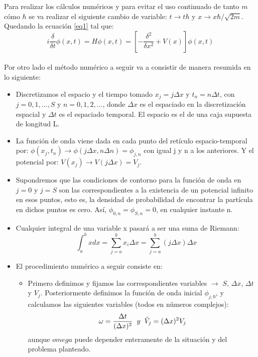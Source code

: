 \documentclass[12pt,paper]{article}
\begin{document}
Para realizar los cálculos numéricos y para evitar el uso continuado de tanto $m$ cómo $\hbar$ se va realizar el siguiente cambio de variable: $t \rightarrow t \hbar$ y $x \rightarrow x \hbar/ \sqrt{2m}$. Quedando la ecuación \ref{eq1} tal que:
\begin{equation}
    i \frac{\delta}{\delta t} \phi(x,t) = H \phi(x,t) = [-\frac{\delta^2}{\delta x^2} + V(x)] \phi(x,t)
\end{equation}\\

Por otro lado el método numérico a seguir va a consistir de manera resumida en lo siguiente:\\
\begin{itemize}
    \item Discretizamos el espacio y el tiempo tomado $x_j = j \Delta x$ y $t_n = n \Delta t$, con $j = 0, 1, ..., S$ y $n = 0, 1, 2, ...$, donde $\Delta x$ es el espaciado en la discretización espacial y $\Delta t$ es el espaciado temporal. El espacio es el de una caja supuesta de longitud L.

    \item La función de onda viene dada en cada punto del retículo espacio-temporal por: $\phi(x_j, t_n) \rightarrow \phi(j \Delta x, n \Delta n) = \phi_{j,n}$ con igual j y n a los anteriores. Y el potencial por: $V(x_j) \rightarrow V(j \Delta x) = V_j$.

    \item Supondremos que las condiciones de contorno para la función de onda en $j = 0$ y $j = S$ son las correspondientes a la existencia de un potencial infinito en esos puntos, esto es, la densidad de probabilidad de encontrar la partícula en dichos puntos es cero. Así, $\phi_{0,n} = \phi_{S,n} = 0$, en cualquier instante n.

    \item Cualquier integral de una variable x pasará a ser una suma de Riemann:
    \begin{equation*}
        \int_a^b x dx = \sum_{j=a}^b x_i \Delta x = \sum_{j=a}^b (j \Delta x) \Delta x
    \end{equation*}

    \item El procedimiento numérico a seguir consiste en:
    \begin{itemize}
    
        \item Primero definimos y fijamos las correspondientes variables $\rightarrow$ $S$, $\Delta x$, $\Delta t$ y $V_j$. Posteriormente definimos la función de onda inicial $\phi_{j,0}$, y calculamos las siguientes variables (todos en números complejos):\\
        \begin{equation*}
            \omega = \frac{\Delta t}{(\Delta x)^2} \hspace{2mm} y \hspace{2mm} \Tilde{V}_j=(\Delta x)^2V_j
        \end{equation*}
        aunque $omega$ puede depender enteramente de la situación y del problema planteado.
        

\end{itemize}
\end{itemize}
\end{document}
